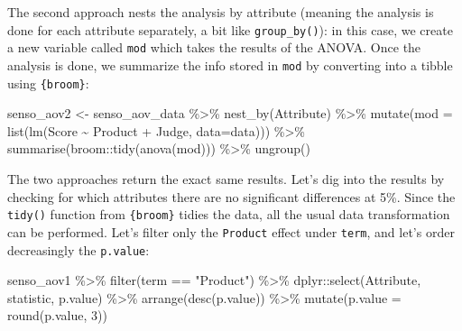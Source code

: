 \documentclass[
]{book}
\newenvironment{Shaded}{\begin{snugshade}}{\end{snugshade}}
\newcommand{\AttributeTok}[1]{\textcolor[rgb]{0.77,0.63,0.00}{#1}}
\newcommand{\DecValTok}[1]{\textcolor[rgb]{0.00,0.00,0.81}{#1}}
\newcommand{\FunctionTok}[1]{\textcolor[rgb]{0.00,0.00,0.00}{#1}}
\newcommand{\NormalTok}[1]{#1}
\newcommand{\OtherTok}[1]{\textcolor[rgb]{0.56,0.35,0.01}{#1}}
\newcommand{\SpecialCharTok}[1]{\textcolor[rgb]{0.00,0.00,0.00}{#1}}
\newcommand{\StringTok}[1]{\textcolor[rgb]{0.31,0.60,0.02}{#1}}
\begin{document}
The second approach nests the analysis by attribute (meaning the analysis is done for each attribute separately, a bit like \texttt{group\_by()}): in this case, we create a new variable called \texttt{mod} which takes the results of the ANOVA.
Once the analysis is done, we summarize the info stored in \texttt{mod} by converting into a tibble using \texttt{\{broom\}}:

\begin{Shaded}
\begin{Highlighting}[]
\NormalTok{senso\_aov2 }\OtherTok{\textless{}{-}}\NormalTok{ senso\_aov\_data }\SpecialCharTok{\%\textgreater{}\%} 
  \FunctionTok{nest\_by}\NormalTok{(Attribute) }\SpecialCharTok{\%\textgreater{}\%} 
  \FunctionTok{mutate}\NormalTok{(}\AttributeTok{mod =} \FunctionTok{list}\NormalTok{(}\FunctionTok{lm}\NormalTok{(Score }\SpecialCharTok{\textasciitilde{}}\NormalTok{ Product }\SpecialCharTok{+}\NormalTok{ Judge, }\AttributeTok{data=}\NormalTok{data))) }\SpecialCharTok{\%\textgreater{}\%} 
  \FunctionTok{summarise}\NormalTok{(broom}\SpecialCharTok{::}\FunctionTok{tidy}\NormalTok{(}\FunctionTok{anova}\NormalTok{(mod))) }\SpecialCharTok{\%\textgreater{}\%} 
  \FunctionTok{ungroup}\NormalTok{()}
\end{Highlighting}
\end{Shaded}

The two approaches return the exact same results. Let's dig into the results by checking for which attributes there are no significant differences at 5\%. Since the \texttt{tidy()} function from \texttt{\{broom\}} tidies the data, all the usual data transformation can be performed. Let's filter only the \texttt{Product} effect under \texttt{term}, and let's order decreasingly the \texttt{p.value}:

\begin{Shaded}
\begin{Highlighting}[]
\NormalTok{senso\_aov1 }\SpecialCharTok{\%\textgreater{}\%} 
  \FunctionTok{filter}\NormalTok{(term }\SpecialCharTok{==} \StringTok{"Product"}\NormalTok{) }\SpecialCharTok{\%\textgreater{}\%} 
\NormalTok{  dplyr}\SpecialCharTok{::}\FunctionTok{select}\NormalTok{(Attribute, statistic, p.value) }\SpecialCharTok{\%\textgreater{}\%} 
  \FunctionTok{arrange}\NormalTok{(}\FunctionTok{desc}\NormalTok{(p.value)) }\SpecialCharTok{\%\textgreater{}\%} 
  \FunctionTok{mutate}\NormalTok{(}\AttributeTok{p.value =} \FunctionTok{round}\NormalTok{(p.value, }\DecValTok{3}\NormalTok{))}
\end{Highlighting}
\end{Shaded}
\end{document}

